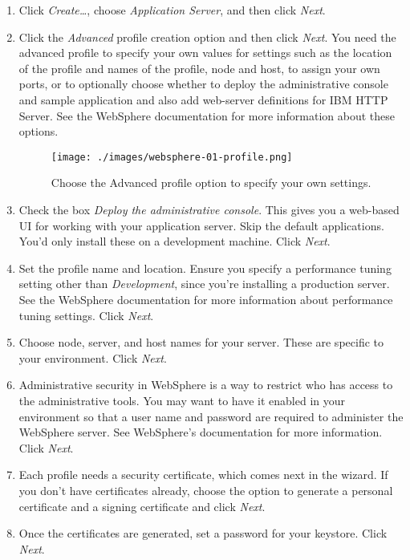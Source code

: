 \begin{enumerate}
\def\labelenumi{\arabic{enumi}.}
\item
  Click \emph{Create\ldots{}}, choose \emph{Application Server}, and
  then click \emph{Next}.
\item
  Click the \emph{Advanced} profile creation option and then click
  \emph{Next}. You need the advanced profile to specify your own values
  for settings such as the location of the profile and names of the
  profile, node and host, to assign your own ports, or to optionally
  choose whether to deploy the administrative console and sample
  application and also add web-server definitions for IBM HTTP Server.
  See the WebSphere documentation for more information about these
  options.

  \begin{figure}
  \centering
  \texttt{[image: ./images/websphere-01-profile.png]}
  \caption{Choose the Advanced profile option to specify your own
  settings.}
  \end{figure}
\item
  Check the box \emph{Deploy the administrative console}. This gives you
  a web-based UI for working with your application server. Skip the
  default applications. You'd only install these on a development
  machine. Click \emph{Next}.
\item
  Set the profile name and location. Ensure you specify a performance
  tuning setting other than \emph{Development}, since you're installing
  a production server. See the WebSphere documentation for more
  information about performance tuning settings. Click \emph{Next}.
\item
  Choose node, server, and host names for your server. These are
  specific to your environment. Click \emph{Next}.
\item
  Administrative security in WebSphere is a way to restrict who has
  access to the administrative tools. You may want to have it enabled in
  your environment so that a user name and password are required to
  administer the WebSphere server. See WebSphere's documentation for
  more information. Click \emph{Next}.
\item
  Each profile needs a security certificate, which comes next in the
  wizard. If you don't have certificates already, choose the option to
  generate a personal certificate and a signing certificate and click
  \emph{Next}.
\item
  Once the certificates are generated, set a password for your keystore.
  Click \emph{Next}.

\end{enumerate}
